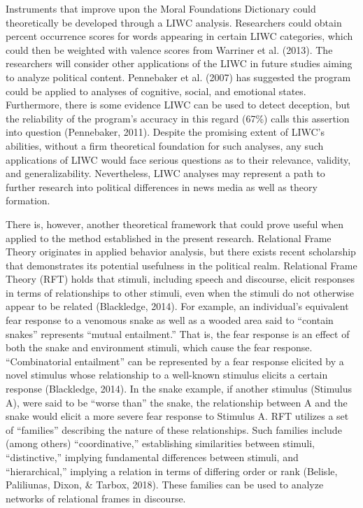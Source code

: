 \documentclass[english,,man]{apa6}
\begin{document}
Instruments that improve upon the Moral Foundations Dictionary could theoretically be developed through a LIWC analysis. Researchers could obtain percent occurrence scores for words appearing in certain LIWC categories, which could then be weighted with valence scores from Warriner et al. (2013). The researchers will consider other applications of the LIWC in future studies aiming to analyze political content. Pennebaker et al. (2007) has suggested the program could be applied to analyses of cognitive, social, and emotional states. Furthermore, there is some evidence LIWC can be used to detect deception, but the reliability of the program's accuracy in this regard (67\%) calls this assertion into question (Pennebaker, 2011). Despite the promising extent of LIWC's abilities, without a firm theoretical foundation for such analyses, any such applications of LIWC would face serious questions as to their relevance, validity, and generalizability. Nevertheless, LIWC analyses may represent a path to further research into political differences in news media as well as theory formation.

There is, however, another theoretical framework that could prove useful when applied to the method established in the present research. Relational Frame Theory originates in applied behavior analysis, but there exists recent scholarship that demonstrates its potential usefulness in the political realm. Relational Frame Theory (RFT) holds that stimuli, including speech and discourse, elicit responses in terms of relationships to other stimuli, even when the stimuli do not otherwise appear to be related (Blackledge, 2014). For example, an individual's equivalent fear response to a venomous snake as well as a wooded area said to \enquote{contain snakes} represents \enquote{mutual entailment.} That is, the fear response is an effect of both the snake and environment stimuli, which cause the fear response. \enquote{Combinatorial entailment} can be represented by a fear response elicited by a novel stimulus whose relationship to a well-known stimulus elicits a certain response (Blackledge, 2014). In the snake example, if another stimulus (Stimulus A), were said to be \enquote{worse than} the snake, the relationship between A and the snake would elicit a more severe fear response to Stimulus A. RFT utilizes a set of \enquote{families} describing the nature of these relationships. Such families include (among others) \enquote{coordinative,} establishing similarities between stimuli, \enquote{distinctive,} implying fundamental differences between stimuli, and \enquote{hierarchical,} implying a relation in terms of differing order or rank (Belisle, Paliliunas, Dixon, \& Tarbox, 2018). These families can be used to analyze networks of relational frames in discourse.
\end{document}

